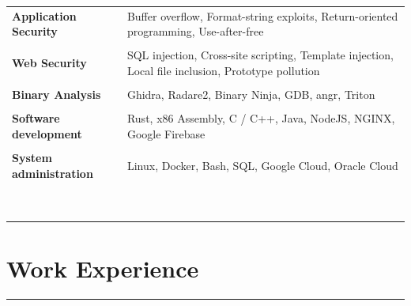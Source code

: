 \documentclass[letterpaper]{article}
\newcommand{\sectcolor}{cyan}
\newcommand{\sect}[1]{\section*{#1}
                        {\color{\sectcolor}
                        \rule{\textwidth}{1pt}
                        \vspace{-1ex}}}
\begin{document}
        \begin{tabular}{>{\raggedleft\arraybackslash}p{}
                        p{}}
            \textbf{Application Security} &
                Buffer overflow,
                Format-string exploits,
                Return-oriented programming,
                Use-after-free
                \\\\
            \textbf{Web Security} &
                SQL injection,
                Cross-site scripting,
                Template injection,
                Local file inclusion,
                Prototype pollution
                \\\\
            \textbf{Binary Analysis} &
                Ghidra,
                Radare2,
                Binary Ninja,
                GDB,
                angr,
                Triton
                \\\\
            \textbf{Software development} &
                Rust,
                x86 Assembly,
                C / C++,
                Java,
                NodeJS,
                NGINX,
                Google Firebase
                \\\\
            \textbf{System administration} &
                Linux,
                Docker,
                Bash,
                SQL,
                Google Cloud,
                Oracle Cloud
                \\\\

                \\\\\\\\\\\\\\\\
        \end{tabular}

    \sect{Work Experience}
\end{document}
